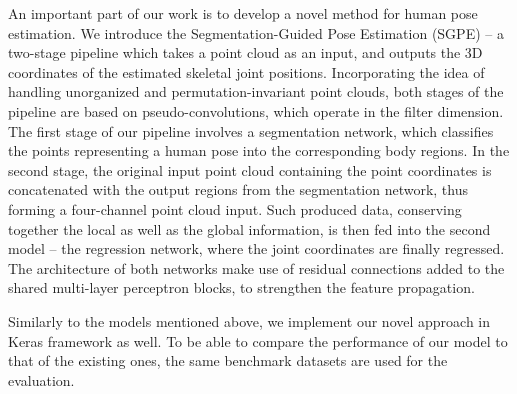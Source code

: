 An important part of our work is to develop a novel method for human pose estimation. We introduce the Segmentation-Guided Pose Estimation (SGPE) – a two-stage pipeline which takes a point cloud as an input, and outputs the 3D coordinates of the estimated skeletal joint positions. Incorporating the idea of handling unorganized and permutation-invariant point clouds, both stages of the pipeline are based on pseudo-convolutions, which operate in the filter dimension. The first stage of our pipeline involves a segmentation network, which classifies the points representing a human pose into the corresponding body regions. In the second stage, the original input point cloud containing the point coordinates is concatenated with the output regions from the segmentation network, thus forming a four-channel point cloud input. Such produced data, conserving together the local as well as the global information, is then fed into the second model – the regression network, where the joint coordinates are finally regressed. The architecture of both networks make use of residual connections added to the shared multi-layer perceptron blocks, to strengthen the feature propagation.\par
\vspace{5mm}
\noindent Similarly to the models mentioned above, we implement our novel approach in Keras framework as well. To be able to compare the performance of our model to that of the existing ones, the same benchmark datasets are used for the evaluation.



